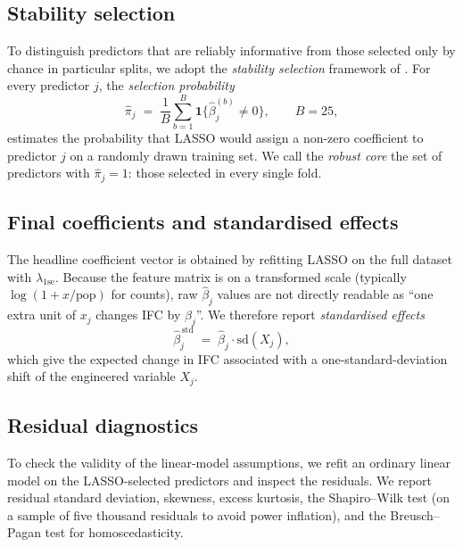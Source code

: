 \documentclass[11pt,a4paper]{article}
\begin{document}
\subsection{Stability selection}
\label{sec:stability}

To distinguish predictors that are reliably informative from those
selected only by chance in particular splits, we adopt the
\emph{stability selection} framework of
\citet{meinshausenbuhlmann2010}. For every predictor \(j\), the
\emph{selection probability}
\begin{equation}
  \hat{\pi}_{j}
  \;=\;
  \frac{1}{B} \sum_{b=1}^{B}
  \mathbf{1}\!\bigl\{\hat{\beta}_{j}^{(b)} \neq 0\bigr\},
  \qquad B = 25,
  \label{eq:stab}
\end{equation}
estimates the probability that LASSO would assign a non-zero
coefficient to predictor \(j\) on a randomly drawn training set. We
call the \emph{robust core} the set of predictors with
\(\hat{\pi}_{j} = 1\): those selected in every single fold.

\subsection{Final coefficients and standardised effects}

The headline coefficient vector is obtained by refitting LASSO on the
full dataset with \(\lambda_{\mathrm{1se}}\). Because the feature
matrix is on a transformed scale (typically \(\log(1+x/\text{pop})\)
for counts), raw \(\hat{\beta}_{j}\) values are not directly readable
as ``one extra unit of \(x_{j}\) changes IFC by \(\hat{\beta}_{j}\)''.
We therefore report \emph{standardised effects}
\begin{equation}
  \hat{\beta}_{j}^{\,\text{std}}
  \;=\;
  \hat{\beta}_{j} \cdot \mathrm{sd}(X_{j}),
  \label{eq:stdeff}
\end{equation}
which give the expected change in IFC associated with a
one-standard-deviation shift of the engineered variable
\(X_{j}\).

\subsection{Residual diagnostics}

To check the validity of the linear-model assumptions, we refit an
ordinary linear model on the LASSO-selected predictors and inspect
the residuals. We report residual standard deviation, skewness,
excess kurtosis, the Shapiro--Wilk test (on a sample of five
thousand residuals to avoid power inflation), and the Breusch--Pagan
test for homoscedasticity.
\end{document}
